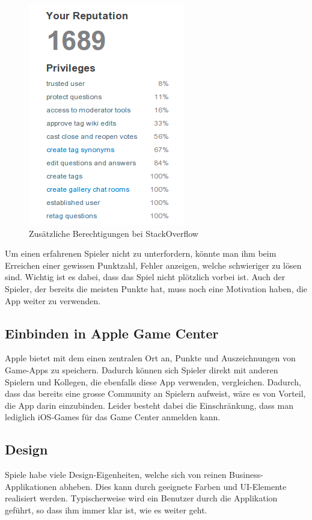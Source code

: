 \begin{figure}[H]
	\centering
	\includegraphics[scale=0.7]{images/gamification/so-privileges}
	\caption{Zusätzliche Berechtigungen bei StackOverflow}
	\label{gamification-so-privileges}
\end{figure}

Um einen erfahrenen Spieler nicht zu unterfordern, könnte man ihm beim Erreichen einer gewissen Punktzahl, Fehler anzeigen, welche schwieriger zu lösen sind.
Wichtig ist es dabei, dass das Spiel nicht plötzlich vorbei ist.
Auch der Spieler, der bereits die meisten Punkte hat, muss noch eine Motivation haben, die App weiter zu verwenden.

\subsection{Einbinden in Apple Game Center}
Apple bietet mit dem  einen zentralen Ort an, Punkte und Auszeichnungen von Game-Apps zu speichern.
Dadurch können sich Spieler direkt mit anderen Spielern und Kollegen, die ebenfalls diese App verwenden, vergleichen.
Dadurch, dass das  bereits eine grosse Community an Spielern aufweist, wäre es von Vorteil, die App darin einzubinden.
Leider besteht dabei die Einschränkung, dass man lediglich iOS-Games für das Game Center anmelden kann.

\subsection{Design}
Spiele habe viele Design-Eigenheiten, welche sich von reinen Business-Applikationen abheben.
Dies kann durch geeignete Farben und UI-Elemente realisiert werden.
Typischerweise wird ein Benutzer durch die Applikation geführt, so dass ihm immer klar ist, wie es weiter geht.

